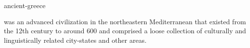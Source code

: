 \documentclass{stex}
\begin{document}
\begin{smodule}{ancient-greece}
\begin{sparagraph}[style=symdoc]
 was an advanced civilization in the northeastern
Mediterranean that existed from the 12th century \BCE{} to around 600 \CE{} and
comprised a loose collection of culturally and linguistically related 
city-states and other areas.
\end{sparagraph}
\end{smodule}
\end{document}
